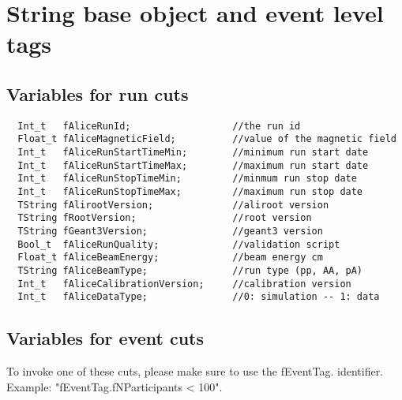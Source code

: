 \section{String base object and event level tags}
\label{App:StringCuts}
\subsection{Variables for run cuts}
{\ttfamily \noindent
\begin{verbatim}
  Int_t   fAliceRunId;                  //the run id
  Float_t fAliceMagneticField;          //value of the magnetic field
  Int_t   fAliceRunStartTimeMin;        //minimum run start date
  Int_t   fAliceRunStartTimeMax;        //maximum run start date
  Int_t   fAliceRunStopTimeMin;         //minmum run stop date
  Int_t   fAliceRunStopTimeMax;         //maximum run stop date
  TString fAlirootVersion;              //aliroot version
  TString fRootVersion;                 //root version
  TString fGeant3Version;               //geant3 version
  Bool_t  fAliceRunQuality;             //validation script
  Float_t fAliceBeamEnergy;             //beam energy cm
  TString fAliceBeamType;               //run type (pp, AA, pA)
  Int_t   fAliceCalibrationVersion;     //calibration version  
  Int_t   fAliceDataType;               //0: simulation -- 1: data  
\end{verbatim}
}
\subsection{Variables for event cuts}
To invoke one of these cuts, please make sure to use the {\ttfamily fEventTag.} identifier. Example: {\ttfamily "fEventTag.fNParticipants < 100"}.

